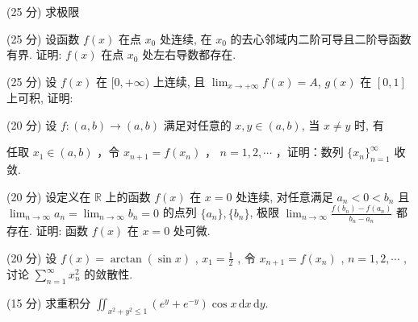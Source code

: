 \par{}
(25 分) 求极限\par
\nopagebreak[4]
(25 分) 设函数 $f(x)$ 在点 $x_0$ 处连续, 在 $x_0$ 的去心邻域内二阶可导且二阶导函数有界. 证明: $f(x)$ 在点 $x_0$ 处左右导数都存在.\par
\par{}
(25 分) 设 $f(x)$ 在 $[0, +\infty)$ 上连续, 且 $\lim_{x \to +\infty} f(x) = A$, $g(x)$ 在 $[0, 1]$ 上可积, 证明:\par
\nopagebreak[4]
\par{}
(20 分) 设 $f: (a, b) \to (a, b)$ 满足对任意的 $x, y \in (a, b)$, 当 $x \neq y$ 时, 有\par
\nopagebreak[4]
任取  $x_{1} \in (a, b)$ ，令  $x_{n+1} = f(x_{n})$ ， $n = 1, 2, \cdots$ ，证明：数列  $\{x_{n}\}_{n=1}^{\infty}$  收敛.\par
(20 分) 设定义在 $\mathbb{R}$ 上的函数 $f(x)$ 在 $x = 0$ 处连续, 对任意满足 $a_{n} < 0 < b_{n}$ 且 $\lim_{n\to \infty}a_n = \lim_{n\to \infty}b_n = 0$ 的点列 $\{a_{n}\}, \{b_{n}\}$, 极限 $\lim_{n\to \infty}\frac{f(b_n) - f(a_n)}{b_n - a_n}$ 都存在. 证明: 函数 $f(x)$ 在 $x = 0$ 处可微.\par
(20 分) 设  $f(x)=\arctan(\sin x)$ ,  $x_{1}=\frac{1}{2}$ , 令  $x_{n+1}=f(x_{n})$ ,  $n=1,2,\cdots$ , 讨论  $\sum_{n=1}^{\infty}x_{n}^{2}$  的敛散性.\par
(15 分) 求重积分 $\iint_{x^2 + y^2 \leq 1} (e^y + e^{-y}) \cos x \, \mathrm{d}x \, \mathrm{d}y$.\par
